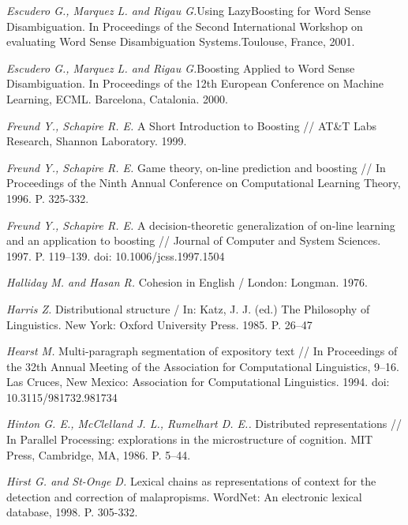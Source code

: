 \documentclass{article}
\begin{document}
\begin{articletext}
\begin{thebibliography}{9}


\textit{Escudero G., Marquez L. and Rigau G.}Using LazyBoosting for Word Sense Disambiguation. In Proceedings of the Second 
International Workshop on evaluating Word Sense Disambiguation Systems.Toulouse, France, 2001.

\textit{Escudero G., Marquez L. and Rigau G.}Boosting Applied to Word Sense Disambiguation. In Proceedings of the 12th 
European Conference on Machine Learning, ECML. Barcelona, Catalonia. 2000. 

\textit{Freund Y., Schapire R. E. }A Short Introduction to Boosting // AT\&T Labs Research, Shannon Laboratory.  1999.

\textit{Freund Y.,  Schapire R. E. }Game theory, on-line prediction and boosting // In Proceedings of the Ninth Annual Conference on Computational Learning Theory,  1996. P. 325-332.

\textit{Freund Y.,  Schapire R. E. }A decision-theoretic generalization of on-line learning and an application to boosting // Journal of Computer and System Sciences. 1997. P. 119–139. doi: 10.1006/jcss.1997.1504

\textit{Halliday M. and  Hasan R. }Cohesion in English / London: Longman. 1976. 

\textit{Harris Z. }Distributional structure / In: Katz, J. J. (ed.) The Philosophy of Linguistics. New York: Oxford University Press. 1985. P. 26–47

\textit{Hearst M. }Multi-paragraph segmentation of expository text // In Proceedings of the 32th Annual Meeting of the Association for Computational Linguistics, 9–16. Las Cruces, New Mexico: Association for Computational Linguistics. 1994. doi: 10.3115/981732.981734

\textit{Hinton G. E.,  McClelland J. L.,  Rumelhart D. E.. }Distributed representations // In Parallel Processing: explorations in the microstructure of cognition. MIT Press, Cambridge, MA, 1986. P. 5–44.

\textit{Hirst G. and  St-Onge D. }Lexical chains as representations of context for the detection and correction of malapropisms. WordNet: An electronic lexical database, 1998. P. 305-332.


\end{thebibliography}
\end{articletext}
\end{document}
